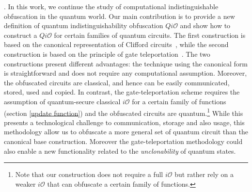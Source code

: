 . In this work, we continue the study of computational indistinguishable obfuscation in the quantum world. Our main contribution is to provide a new definition of quantum indistinguishability obfuscation $Qi\mathcal{O}$ and show how to construct a $Qi\mathcal{O}$ for certain families of quantum circuits. The first construction is based on the canonical representation of Clifford circuits~\cite{AG04}, while the second construction is based on the principle of gate teleportation~\cite{GC99}. The two constructions present different advantages: the technique using the canonical form is straightforward and does not require any computational assumption. Moreover, the obfuscated circuits are classical, and hence can be easily communicated, stored, used and copied.  In contrast, the gate-teleportation scheme requires the assumption of quantum-secure classical $i\mathcal{O}$ for a certain family of functions (section \ref{update function}) and the obfuscated circuits are quantum.\footnote{Note that our construction does not require a full $i\mathcal{O}$ but rather rely on a weaker $i\mathcal{O}$ that can obfuscate a certain family of functions.} While this presents a technological challenge to communication, storage and also usage, this methodology allow us to obfuscate a more general set of quantum circuit than the canonical base construction. Moreover the gate-teleportation methodology could also enable a new functionality related to the \emph{unclonability} of quantum states.

